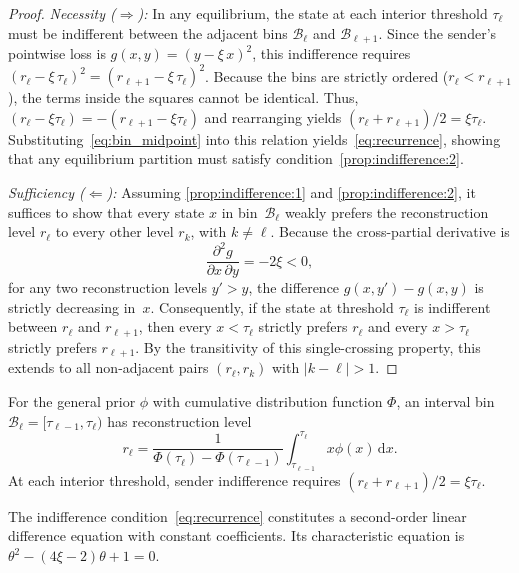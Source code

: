\documentclass[journal,twoside,web]{ieeecolor}
\begin{document}
\begin{proof}
\emph{Necessity ($\Rightarrow$):} In any equilibrium, the state at each interior threshold $\tau_\ell$ must be indifferent between the adjacent bins $\mathcal{B}_\ell$ and $\mathcal{B}_{\ell+1}$. Since the sender's pointwise loss is $g(x,y) = (y - \xi\,x)^2$, this indifference requires $(r_{\ell} - \xi\,\tau_\ell)^2 = (r_{\ell+1} - \xi\,\tau_\ell)^2$. Because the bins are strictly ordered ($r_\ell < r_{\ell+1}$), the terms inside the squares cannot be identical. Thus, $(r_\ell - \xi\tau_\ell) = -(r_{\ell+1} - \xi\tau_\ell)$ and rearranging yields $({r_{\ell}+ r_{\ell+1}})/2 = \xi\tau_{\ell}$. Substituting~\eqref{eq:bin_midpoint} into this relation yields~\eqref{eq:recurrence}, showing that any equilibrium partition must satisfy condition~\ref{prop:indifference:2}.

    \medskip\noindent
    \emph{Sufficiency ($\Leftarrow$):} Assuming \ref{prop:indifference:1} and \ref{prop:indifference:2}, it suffices to show that every state $x$ in bin~$\mathcal{B}_\ell$ weakly prefers the reconstruction level $r_{\ell}$ to every other level $r_k$, with $k\neq\ell$. Because the cross-partial derivative is
    \[
        \frac{\partial^2 g}{\partial x\,\partial y}
        = -2\xi < 0,
    \]
    for any two reconstruction levels $y'>y$, the difference $g(x,y') - g(x,y)$ is strictly decreasing in~$x$. Consequently, if the state at threshold $\tau_\ell$ is indifferent between $r_{\ell}$ and $r_{\ell+1}$, then every $x < \tau_\ell$ strictly prefers $r_{\ell}$ and every $x > \tau_\ell$ strictly prefers $r_{\ell+1}$. By the transitivity of this single-crossing property, this extends to all non-adjacent pairs $(r_{\ell}, r_k)$ with $|k-\ell|>1$.
\end{proof}

\begin{remark}
    \label{rem:generic_prior}
    For the general prior $\phi$ with cumulative distribution function $\Phi$, an interval bin
    $\mathcal B_\ell=[\tau_{\ell-1},\tau_\ell)$ has reconstruction level
    \[
        r_\ell
        =
        \frac{1}
        {\Phi(\tau_\ell)-\Phi(\tau_{\ell-1})} \int_{\tau_{\ell-1}}^{\tau_\ell}x \phi(x)\,\mathrm{d}x.
    \]
    At each interior threshold, sender indifference requires
    $
        {(r_\ell+r_{\ell+1})}/{2}=\xi\tau_\ell.
    $
\end{remark}

The indifference condition~\eqref{eq:recurrence} constitutes a second-order linear difference equation with constant
coefficients. Its characteristic equation is $\theta^2 - (4\xi - 2)\theta + 1 = 0$.
\end{document}
